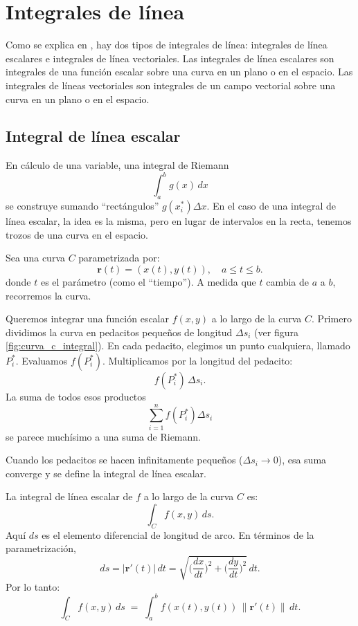 \section{Integrales de línea}

Como se explica en \textcite{openstax_line_integral}, hay dos tipos de integrales de línea: integrales de línea escalares e integrales de línea vectoriales. Las integrales de línea escalares son integrales de una función escalar sobre una curva en un plano o en el espacio. Las integrales de líneas vectoriales son integrales de un campo vectorial sobre una curva en un plano o en el espacio.

\subsection{Integral de línea escalar}

En cálculo de una variable, una integral de Riemann
$$
\int_a^b g(x)\,dx
$$
se construye sumando ``rectángulos'' $g(x_i^\ast)\Delta x$. En el caso de una integral de línea escalar, la idea es la misma, pero en lugar de intervalos en la recta, tenemos trozos de una curva en el espacio.

Sea una curva $C$ parametrizada por:
$$
\mathbf{r}(t) = (x(t), y(t)), \quad a \leq t \leq b.
$$
donde $t$ es el parámetro (como el ``tiempo''). A medida que $t$ cambia de $a$ a $b$, recorremos la curva.

Queremos integrar una función escalar $f(x,y)$ a lo largo de la curva $C$. Primero dividimos la curva en pedacitos pequeños de longitud $\Delta s_i$ (ver figura \ref{fig:curva_c_integral}). En cada pedacito, elegimos un punto cualquiera, llamado $P_i^\ast$. Evaluamos $f(P_i^\ast)$. Multiplicamos por la longitud del pedacito:
$$
f(P_i^\ast)\,\Delta s_i.
$$
La suma de todos esos productos
$$
\sum_{i=1}^n f(P_i^\ast)\Delta s_i
$$
se parece muchísimo a una suma de Riemann.

Cuando los pedacitos se hacen infinitamente pequeños ($\Delta s_i \to 0$), esa suma converge y se define la integral de línea escalar.


La integral de línea escalar de $f$ a lo largo de la curva $C$ es:
$$
\int_C f(x,y)\, ds.
$$
Aquí $ds$ es el elemento diferencial de longitud de arco. En términos de la parametrización,
$$
ds = \lvert\mathbf{r}'(t)\rvert\,dt = \sqrt{\Big(\frac{dx}{dt}\Big)^2 + \Big(\frac{dy}{dt}\Big)^2}\,dt.
$$
Por lo tanto:
$$
\int_C f(x,y)\, ds \;=\; \int_a^b f(x(t), y(t)) \,\|\mathbf{r}'(t)\|\,dt.
$$

